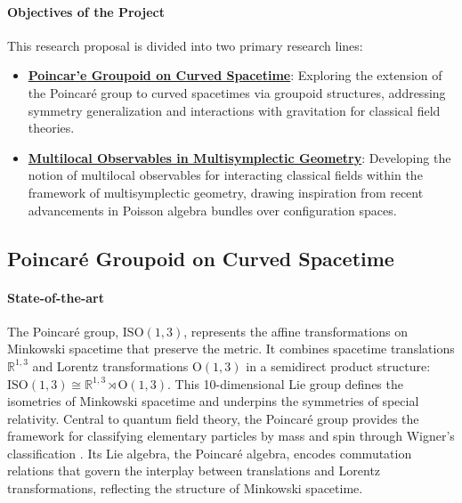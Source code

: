 \documentclass[a4paper]{article}
\begin{document}
\paragraph{Objectives of the Project}
This research proposal is divided into two primary research lines:

\begin{itemize}[noitemsep,topsep=0pt,parsep=0pt,partopsep=0pt]
	\item \hyperref[wp:PoincareGroupoid]{\textbf{Poincar'{e} Groupoid on Curved Spacetime}}: Exploring the extension of the Poincaré group to curved spacetimes via groupoid structures, addressing symmetry generalization and interactions with gravitation for classical field theories.
	\item \hyperref[wp:MultiLocObs]{\textbf{Multilocal Observables in Multisymplectic Geometry}}: Developing the notion of multilocal observables for interacting classical fields within the framework of multisymplectic geometry, drawing inspiration from recent advancements in Poisson algebra bundles over configuration spaces.
\end{itemize}
 


 




\subsection{Poincaré Groupoid on Curved Spacetime}
\label{wp:PoincareGroupoid}

\paragraph{State-of-the-art}
The Poincaré group, $\mathrm{ISO}(1,3)$, represents the affine transformations on Minkowski spacetime that preserve the metric. It combines spacetime translations $\mathbb{R}^{1,3}$ and Lorentz transformations $\mathrm{O}(1,3)$ in a semidirect product structure: $\mathrm{ISO}(1,3) \cong \mathbb{R}^{1,3} \rtimes \mathrm{O}(1,3)$. This 10-dimensional Lie group defines the isometries of Minkowski spacetime and underpins the symmetries of special relativity. Central to quantum field theory, the Poincaré group provides the framework for classifying elementary particles by mass and spin through Wigner's classification \cite{horowitz2021}. Its Lie algebra, the Poincaré algebra, encodes commutation relations that govern the interplay between translations and Lorentz transformations, reflecting the structure of Minkowski spacetime.
\end{document}
